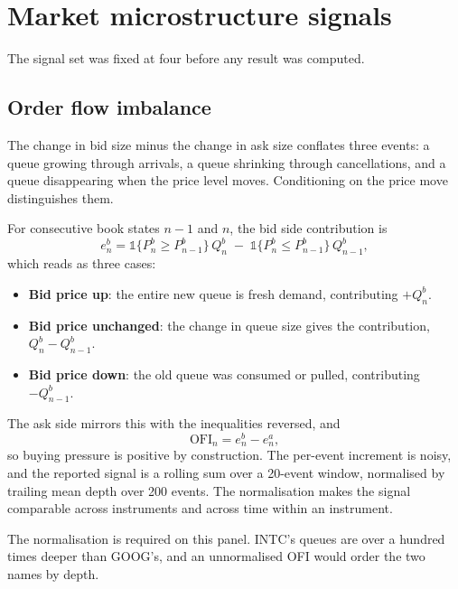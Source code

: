 \documentclass[11pt]{scrartcl}
\begin{document}
\section{Market microstructure signals}
\label{sec:signals}

The signal set was fixed at four before any result was computed.

\subsection{Order flow imbalance}
\label{sec:ofi}

The change in bid size minus the change in ask size conflates three events: a queue growing through arrivals, a queue shrinking through cancellations, and a queue disappearing when the price level moves. Conditioning on the price move distinguishes them.

For consecutive book states $n-1$ and $n$, the bid side contribution is
\begin{equation}
e^b_n = \mathbb{1}\{P^b_n \geq P^b_{n-1}\}\, Q^b_n \; - \; \mathbb{1}\{P^b_n \leq P^b_{n-1}\}\, Q^b_{n-1},
\label{eq:ofibid}
\end{equation}
which reads as three cases:

\begin{itemize}
\item \textbf{Bid price up}: the entire new queue is fresh demand, contributing $+Q^b_n$.
\item \textbf{Bid price unchanged}: the change in queue size gives the contribution, $Q^b_n - Q^b_{n-1}$.
\item \textbf{Bid price down}: the old queue was consumed or pulled, contributing $-Q^b_{n-1}$.
\end{itemize}

The ask side mirrors this with the inequalities reversed, and
\begin{equation}
\mathrm{OFI}_n = e^b_n - e^a_n,
\label{eq:ofi}
\end{equation}
so buying pressure is positive by construction. The per-event increment is noisy, and the reported signal is a rolling sum over a 20-event window, normalised by trailing mean depth over 200 events. The normalisation makes the signal comparable across instruments and across time within an instrument.

The normalisation is required on this panel. INTC's queues are over a hundred times deeper than GOOG's, and an unnormalised OFI would order the two names by depth.
\end{document}
